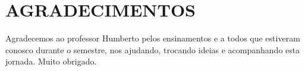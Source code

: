 \noindent\chapter*{\uppercase{Agradecimentos}}

Agradecemos ao professor Humberto pelos ensinamentos e a todos que estiveram conosco durante o semestre, nos ajudando, trocando ideias e acompanhando esta jornada. Muito obrigado.